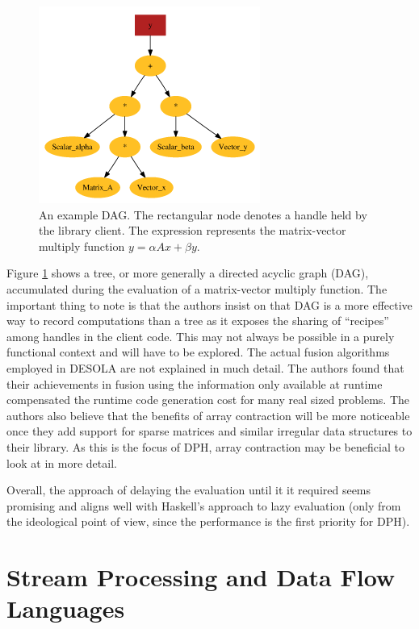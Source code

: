 \documentclass[preamble.tex]{subfiles}
\begin{document}
\begin{figure}
\begin{centering}
\includegraphics{img/DESOLA-running-example}
\par\end{centering}

\caption{\label{fig:Lib:DESOLA-DAG}{An example DAG. The rectangular node denotes a handle held by the library client. The expression represents the matrix-vector multiply function $y = \alpha Ax + \beta y$.}}
\end{figure}


Figure \ref{fig:Lib:DESOLA-DAG} shows a tree, or more generally a directed acyclic graph (DAG), accumulated during the evaluation of a matrix-vector multiply function. The important thing to note is that the authors insist on that DAG is a more effective way to record computations than a tree as it exposes the sharing of {}``recipes'' among handles in the client code. This may not always be possible in a purely functional context and will have to be explored. The actual fusion algorithms employed in DESOLA are not explained in much detail. The authors found that their achievements in fusion using the information only available at runtime compensated the runtime code generation cost for many real sized problems. The authors also believe that the benefits of array contraction will be more noticeable once they add support for sparse matrices and similar irregular data structures to their library. As this is the focus of DPH, array contraction may be beneficial to look at in more detail.

Overall, the approach of delaying the evaluation until it it required seems promising and aligns well with Haskell's approach to lazy evaluation (only from the ideological point of view, since the performance is the first priority for DPH).



\section{Stream Processing and Data Flow Languages}
\end{document}
